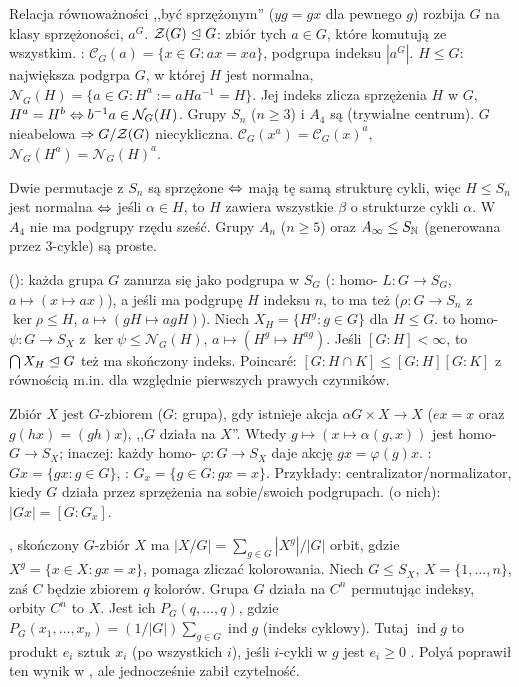 Relacja  równoważności ,,być sprzężonym'' ($yg = gx$ dla pewnego $g$) rozbija $G$ na klasy sprzężoności, $a^G$.
 $\mathcal Z(G) \trianglelefteq G$: zbiór tych $a \in G$, które komutują ze wszystkim.
: $\mathcal C_G(a) = \{x \in G : ax = xa\}$, podgrupa indeksu $|a^G|$.
 $H \le G$: największa podgrpa $G$, w której $H$ jest normalna, $\mathcal N_G(H) = \{a \in G : H^a := aHa^{-1} = H\}$.
Jej indeks zlicza sprzężenia $H$ w $G$, $H^a = H^b \Leftrightarrow b^{-1}a \in \mathcal N_G(H)$.
Grupy $S_n$ ($n \ge 3$) i $A_4$ są  (trywialne centrum).
$G$ nieabelowa $\Rightarrow G/\mathcal Z(G)$ niecykliczna.
$\mathcal C_G(x^a) = \mathcal C_G(x)^a$, $\mathcal N_G(H^a) = \mathcal N_G(H)^a$.

Dwie  permutacje z $S_n$ są sprzężone $\Leftrightarrow$ mają tę samą strukturę cykli, więc $H \le S_n$ jest normalna $\Leftrightarrow$ jeśli $\alpha \in H$, to $H$ zawiera wszystkie $\beta$ o strukturze cykli $\alpha$.
W $A_4$ nie ma podgrupy rzędu sześć.
Grupy $A_n$ ($n \ge 5$) oraz $A_\infty \le S_{\mathbb{N}}$ (generowana przez 3-cykle) są proste.

 ():  każda grupa $G$ zanurza się jako podgrupa w $S_G$ (: homo- $L \colon G \to S_G$, $a \mapsto (x \mapsto ax)$), a jeśli ma podgrupę $H$ indeksu $n$, to ma też  ($\rho \colon  G \to S_n$ z $\ker \rho \le H$, $a \mapsto (gH \mapsto agH)$).
Niech $X_H = \{H^g : g \in G\}$ dla $H \le G$.
 to homo- $\psi \colon G \to S_X$ z $\ker \psi \le \mathcal N_G(H)$, $a \mapsto (H^g \mapsto H^{ag})$.
Jeśli $[G:H] < \infty$, to $\bigcap X_H \trianglelefteq G$ też ma skończony indeks.
Poincaré: $[G : H \cap K] \le [G : H][G : K]$ z równością m.in. dla względnie pierwszych prawych czynników.

Zbiór $X$  jest $G$-zbiorem ($G$: grupa), gdy istnieje akcja $\alpha G \times X \to X$ ($ex = x$ oraz $g(hx) = (gh)x$), ,,$G$ działa na $X$''.
Wtedy $g \mapsto (x \mapsto \alpha(g,x))$ jest homo- $G \to S_X$; inaczej: każdy homo- $\varphi \colon G \to S_X$ daje akcję $gx = \varphi(g)x$.
: $Gx = \{gx : g \in G\}$, : $G_x = \{g \in G : gx = x\}$.
Przykłady: centralizator/normalizator, kiedy $G$ działa przez sprzężenia na sobie/swoich podgrupach.
 (o nich): $|Gx| = [G : G_x]$.

, skończony  $G$-zbiór $X$ ma $|X/G| = \sum_{g \in G} |X^g| / |G|$ orbit, gdzie $X^g = \{x \in X : gx = x\}$, pomaga zliczać kolorowania.
Niech $G \le S_X$, $X = \{1, \ldots, n\}$, zaś $C$ będzie zbiorem $q$ kolorów.
Grupa $G$ działa na $C^n$ permutując indeksy, orbity $C^n$ to  $X$.
Jest ich $P_G(q, \ldots, q)$, gdzie $P_G(x_1, \ldots, x_n) = (1 / |G|) \sum_{g \in G} \operatorname{ind} g$ (indeks cyklowy).
Tutaj $\operatorname{ind} g$ to produkt $e_i$ sztuk $x_i$ (po wszystkich $i$), jeśli $i$-cykli w $g$ jest $e_i \ge 0$ .
Polyá poprawił ten wynik w , ale jednocześnie zabił czytelność.